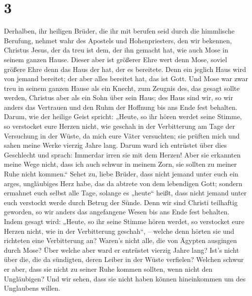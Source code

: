 \hypertarget{section-2}{%
\section{3}\label{section-2}}

 Derhalben, ihr heiligen Brüder, die ihr mit berufen seid
durch die himmlische Berufung, nehmet wahr des Apostels und
Hohenpriesters, den wir bekennen, Christus Jesus,  der da
treu ist dem, der ihn gemacht hat, wie auch Mose in seinem ganzen Hause.
 Dieser aber ist größerer Ehre wert denn Mose, soviel
größere Ehre denn das Haus der hat, der es bereitete. 
Denn ein jeglich Haus wird von jemand bereitet; der aber alles bereitet
hat, das ist Gott.  Und Mose war zwar treu in seinem
ganzen Hause als ein Knecht, zum Zeugnis des, das gesagt sollte werden,
 Christus aber als ein Sohn über sein Haus; des Haus sind
wir, so wir anders das Vertrauen und den Ruhm der Hoffnung bis ans Ende
fest behalten.  Darum, wie der heilige Geist spricht:
„Heute, so ihr hören werdet seine Stimme,  so verstocket
eure Herzen nicht, wie geschah in der Verbitterung am Tage der
Versuchung in der Wüste,  da mich eure Väter versuchten;
sie prüften mich und sahen meine Werke vierzig Jahre lang.
 Darum ward ich entrüstet über dies Geschlecht und
sprach: Immerdar irren sie mit dem Herzen! Aber sie erkannten meine Wege
nicht,  dass ich auch schwur in meinem Zorn, sie sollten
zu meiner Ruhe nicht kommen.``  Sehet zu, liebe Brüder,
dass nicht jemand unter euch ein arges, ungläubiges Herz habe, das da
abtrete von dem lebendigen Gott;  sondern ermahnet euch
selbst alle Tage, solange es „heute`` heißt, dass nicht jemand unter
euch verstockt werde durch Betrug der Sünde.  Denn wir
sind Christi teilhaftig geworden, so wir anders das angefangene Wesen
bis ans Ende fest behalten.  Indem gesagt wird: „Heute,
so ihr seine Stimme hören werdet, so verstocket eure Herzen nicht, wie
in der Verbitterung geschah``, --  welche denn hörten sie
und richteten eine Verbitterung an? Waren's nicht alle, die von Ägypten
ausgingen durch Mose?  Über welche aber ward er entrüstet
vierzig Jahre lang? Ist's nicht über die, die da sündigten, deren Leiber
in der Wüste verfielen?  Welchen schwur er aber, dass sie
nicht zu seiner Ruhe kommen sollten, wenn nicht den Ungläubigen?
 Und wir sehen, dass sie nicht haben können hineinkommen
um des Unglaubens willen.

